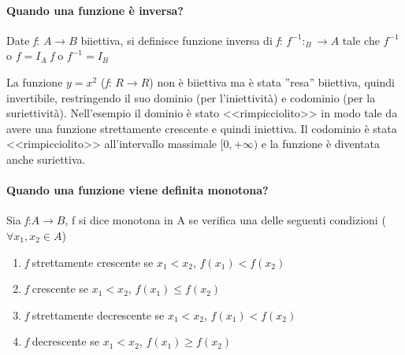 \paragraph{Quando una funzione è inversa?}
Date \textit{f}: $A\to B$ biiettiva, si definisce funzione inversa di
\textit{f}: $f^{-1}:_B\to A$ tale che $f^{-1}$ o $f=I_A$ \textit{f} o
$f^{-1}=I_B$

\begin{nota}
	La funzione $y=x^2$ (\textit{f}: $R\to R$) non è biiettiva ma è stata
	''resa'' biiettiva, quindi invertibile, restringendo il suo dominio
	(per l'iniettività) e codominio (per la suriettività). Nell'esempio il
	dominio è stato <<rimpicciolito>> in modo tale da avere una funzione
	strettamente crescente e quindi iniettiva. Il codominio è stata
	<<rimpicciolito>> all'intervallo massimale $[0,+\infty)$ e la funzione è
	diventata anche suriettiva.
\end{nota}
\paragraph{Quando una funzione viene definita monotona?}
Sia \textit{f}:$A\to B$, f si dice monotona in A se verifica una delle seguenti
condizioni ($\forall x_1,x_2\in A$)

\begin{enumerate}
	\item \textit{f} strettamente crescente se $x_1<x_2$, $f(x_1)<f(x_2)$
	\item \textit{f} crescente se $x_1<x_2$, $f(x_1)\leq f(x_2)$
	\item \textit{f} strettamente decrescente se $x_1<x_2$, $f(x_1)<f(x_2)$
	\item \textit{f} decrescente se $x_1<x_2$, $f(x_1)\geq f(x_2)$
\end{enumerate}
\clearpage
